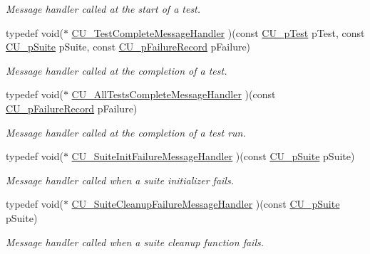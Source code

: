 \begin{DoxyCompactItemize}
\begin{DoxyCompactList}\small\item\em Message handler called at the start of a test. \end{DoxyCompactList}\item 
typedef void($\ast$ \hyperlink{group___framework_ga2c11da75531b097ca037223489bf02be}{C\+U\+\_\+\+Test\+Complete\+Message\+Handler} )(const \hyperlink{group___framework_ga249c43fbe4e53452b3f90db1437da04b}{C\+U\+\_\+p\+Test} p\+Test, const \hyperlink{group___framework_gaba832ae8b235f5e70d6a4ac9c3bb1219}{C\+U\+\_\+p\+Suite} p\+Suite, const \hyperlink{group___framework_gafe3d04f76bf2fac18a3b6a9fd9368308}{C\+U\+\_\+p\+Failure\+Record} p\+Failure)
\begin{DoxyCompactList}\small\item\em Message handler called at the completion of a test. \end{DoxyCompactList}\item 
typedef void($\ast$ \hyperlink{group___framework_ga5c8cffc5ce2801990436b3e6992bf770}{C\+U\+\_\+\+All\+Tests\+Complete\+Message\+Handler} )(const \hyperlink{group___framework_gafe3d04f76bf2fac18a3b6a9fd9368308}{C\+U\+\_\+p\+Failure\+Record} p\+Failure)
\begin{DoxyCompactList}\small\item\em Message handler called at the completion of a test run. \end{DoxyCompactList}\item 
typedef void($\ast$ \hyperlink{group___framework_ga53faf49a6045a1fc32c5a0287b800b65}{C\+U\+\_\+\+Suite\+Init\+Failure\+Message\+Handler} )(const \hyperlink{group___framework_gaba832ae8b235f5e70d6a4ac9c3bb1219}{C\+U\+\_\+p\+Suite} p\+Suite)
\begin{DoxyCompactList}\small\item\em Message handler called when a suite initializer fails. \end{DoxyCompactList}\item 
typedef void($\ast$ \hyperlink{group___framework_ga67a720062975e6b7f97df16a1e8e10ce}{C\+U\+\_\+\+Suite\+Cleanup\+Failure\+Message\+Handler} )(const \hyperlink{group___framework_gaba832ae8b235f5e70d6a4ac9c3bb1219}{C\+U\+\_\+p\+Suite} p\+Suite)
\begin{DoxyCompactList}\small\item\em Message handler called when a suite cleanup function fails. \end{DoxyCompactList}\end{DoxyCompactItemize}
